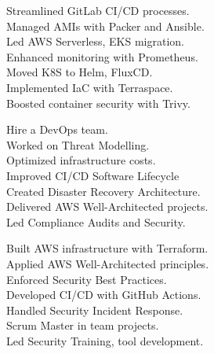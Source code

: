 \documentclass[
	a4paper,
]{fortysecondscv}
\begin{document}
\makefrontsidebar

\begin{cvtable}[2]

\end{cvtable}


\begin{cvtable}[1.5]
	{
		Streamlined GitLab CI/CD processes.\\
		Managed AMIs with Packer and Ansible.\\
		Led AWS Serverless, EKS migration.\\
		Enhanced monitoring with Prometheus.\\
		Moved K8S to Helm, FluxCD.\\
		Implemented IaC with Terraspace.\\
		Boosted container security with Trivy.
	}

	{
		Hire a DevOps team.\\
		Worked on Threat Modelling.\\
		Optimized infrastructure costs.\\
		Improved CI/CD Software Lifecycle \\
		Created Disaster Recovery Architecture.\\
		Delivered AWS Well-Architected projects.\\
		Led Compliance Audits and Security.
	}

	{
		Built AWS infrastructure with Terraform.\\
		Applied AWS Well-Architected principles.\\
		Enforced Security Best Practices.\\
		Developed CI/CD with GitHub Actions.\\
		Handled Security Incident Response.\\
		Scrum Master in team projects.\\
		Led Security Training, tool development.
	}


\end{cvtable}
\end{document}

